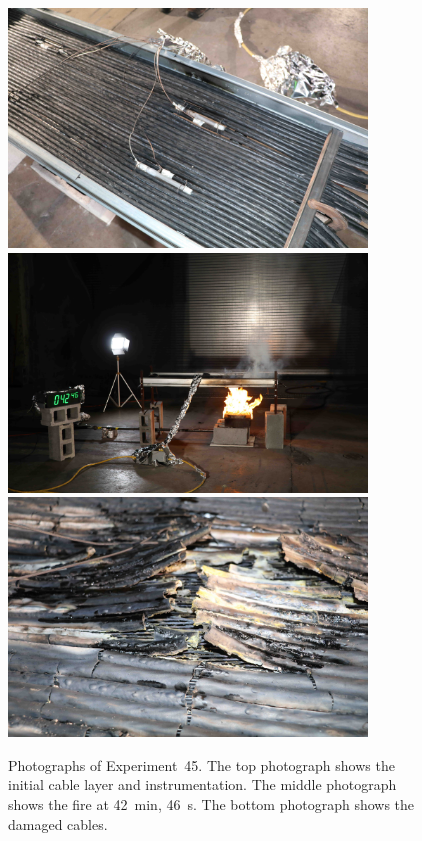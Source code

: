 \begin{figure}[p]
\centering
\includegraphics[height=2.50in]{../FIGURES/Test_45_setup} \\ \vspace{0.1in}
\includegraphics[height=2.50in]{../FIGURES/Test_45_42_min_46_s} \\ \vspace{0.1in}
\includegraphics[height=2.50in]{../FIGURES/Test_45_damage}
\caption[Photographs of Experiment~45]{Photographs of Experiment~45. The top photograph shows the initial cable layer and instrumentation. The middle photograph shows the fire at 42~min, 46~s. The bottom photograph shows the damaged cables.}
\label{fig:Test_45_photos}
\end{figure}


